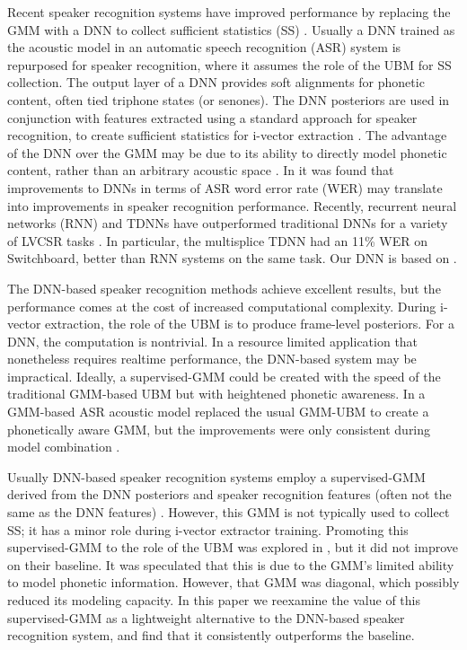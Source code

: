 \documentclass{article}
\begin{document}
Recent speaker recognition systems have improved performance by replacing 
the GMM with a DNN to collect sufficient statistics (SS) \cite{lei2014, garcia2014}. 
Usually a DNN trained as the acoustic model in
an automatic speech recognition (ASR) system is repurposed for
speaker recognition, where it assumes the role of the UBM for SS collection.
The output layer of a DNN provides soft alignments for
phonetic content, often tied triphone states (or senones). 
The DNN posteriors are used in conjunction with features extracted using a 
standard approach for speaker recognition, to create sufficient statistics
for i-vector extraction \cite{ivector}.
The advantage of the DNN over the GMM may
be due to its ability to directly model phonetic content, rather than an arbitrary
acoustic space \cite{lei2014, garcia2014, kenny2014deep}. In \cite{garcia2014} it was found that
improvements to DNNs in terms of ASR word error rate (WER) may translate into 
improvements in speaker
recognition performance. Recently, recurrent neural networks (RNN) and TDNNs \cite{tdnn} have
outperformed traditional DNNs for a variety of LVCSR tasks \cite{lstm, saon2014, multisplice}.
In particular, the multisplice TDNN \cite{multisplice} had an 11\% WER
on Switchboard, better than RNN systems on the same task.
Our DNN is based on \cite{multisplice}. 

The DNN-based speaker recognition methods achieve excellent results, but the
performance comes at the cost of increased computational complexity. During
i-vector extraction, the role of the UBM is to produce frame-level posteriors.
For a DNN, the computation is nontrivial. In a resource limited application
that nonetheless requires realtime performance, the DNN-based system may
be impractical. Ideally, a supervised-GMM could be created with the 
speed of the traditional GMM-based UBM but with heightened phonetic awareness.
In \cite{omar2010} a GMM-based ASR acoustic model replaced the usual GMM-UBM
to create a phonetically aware GMM, but the improvements were only consistent
during model combination \cite{omar2010}.

Usually DNN-based speaker recognition systems employ a supervised-GMM
derived from the DNN posteriors and speaker recognition features (often
not the same as the DNN features) \cite{lei2014, garcia2014, kenny2014deep}.
However, this GMM is not typically
used to collect SS; it has a minor role during i-vector extractor training.
Promoting this supervised-GMM to the role of the UBM was explored
in \cite{lei2014}, but it did not improve on their baseline.
It was speculated that this is due
to the GMM's limited ability to model phonetic information. However,
that GMM was diagonal, which possibly
reduced its modeling capacity. In this paper we reexamine the 
value of this supervised-GMM as a lightweight alternative to the DNN-based
speaker recognition system, and find that it consistently outperforms the
baseline.
\end{document}
